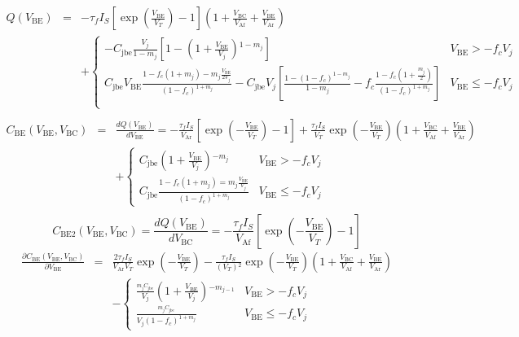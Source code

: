 \documentclass{article}
\begin{document}
\begin{eqnarray*}
Q\left(V_{\text{BE}}\right) &= &
-\tau _fI_S\left[\exp \left(\frac{V_{\text{BE}}}{V_T}\right)-1\right]\left(1+\frac{V_{\text{BC}}}{V_{\text{Af}}}+\frac{V_{\text{BE}}}{V_{\text{Ar}}}\right)\\
&& +\begin{cases}
 -C_{\text{jbe}}\frac{V_j}{1-m_j}\left[1-\left(1+\frac{V_{\text{BE}}}{V_j}\right){}^{1-m_j}\right] & V_{\text{BE}}>-f_cV_j \\
 C_{\text{jbe}}V_{\text{BE}}\frac{1-f_c\left(1+m_j\right)-m_j\frac{V_{\text{BE}}}{2V_j}}{\left(1-f_c\right){}^{1+m_j}}-C_{\text{jbe}}V_j\left[\frac{1-\left(1-f_c\right){}^{1-m_j}}{1-m_j}-f_c\frac{1-f_c\left(1+\frac{m_j}{2}\right)}{\left(1-f_c\right){}^{1+m_j}}\right] & V_{\text{BE}}\leq -f_cV_j\\
\end{cases}\\
\end{eqnarray*}
\begin{eqnarray*}
 C_{\text{BE}}\left(V_{\text{BE}},V_{\text{BC}}\right)& = &
 \frac{dQ\left(V_{\text{BE}}\right)}{dV_{\text{BE}}}=
 -\frac{\tau _fI_S}{V_{\text{Ar}}}\left[\exp \left(-\frac{V_{\text{BE}}}{V_T}\right)-1\right]+\frac{\tau _fI_S}{V_T}\exp \left(-\frac{V_{\text{BE}}}{V_T}\right)\left(1+\frac{V_{\text{BC}}}{V_{\text{Af}}}+\frac{V_{\text{BE}}}{V_{\text{Ar}}}\right)\\
 && +\begin{cases}
 C_{\text{jbe}}\left(1+\frac{V_{\text{BE}}}{V_j}\right){}^{-m_j} & V_{\text{BE}}>-f_cV_j \\
 C_{\text{jbe}}\frac{1-f_c\left(1+m_j\right)=m_j\frac{V_{\text{BE}}}{V_j}}{\left(1-f_c\right){}^{1+m_j}} & V_{\text{BE}}\leq -f_cV_j
\end{cases}\\
\end{eqnarray*}
\begin{equation*}
C_{\text{BE2}}\left(V_{\text{BE}},V_{\text{BC}}\right)=
\frac{dQ\left(V_{\text{BE}}\right)}{dV_{\text{BC}}}=-\frac{\tau _fI_S}{V_{\text{Af}}}\left[\exp \left(-\frac{V_{\text{BE}}}{V_T}\right)-1\right]
\end{equation*}
\begin{eqnarray*}
\frac{\partial C_{\text{BE}}\left(V_{\text{BE}},V_{\text{BC}}\right)}{\partial V_{\text{BE}}} & = &
\frac{2\tau _fI_S}{V_{\text{Ar}}V_T}\exp \left(-\frac{V_{\text{BE}}}{V_T}\right)-\frac{\tau _fI_S}{\left(V_T\right){}^2}\exp \left(-\frac{V_{\text{BE}}}{V_T}\right)\left(1+\frac{V_{\text{BC}}}{V_{\text{Af}}}+\frac{V_{\text{BE}}}{V_{\text{Ar}}}\right)\\
&& -\begin{cases}
 \frac{\text{}_{m_jC_{\text{jbe}}}}{V_j}\left(1+\frac{V_{\text{BE}}}{V_j}\right){}^{-m_{j-1}} & V_{\text{BE}}>-f_cV_j \\
 \frac{\text{}_{m_jC_{\text{jbe}}}}{V_j\left(1-f_c\right){}^{1+m_j}} & V_{\text{BE}}\leq -f_cV_j
\end{cases}\\
\end{eqnarray*}
\end{document}
